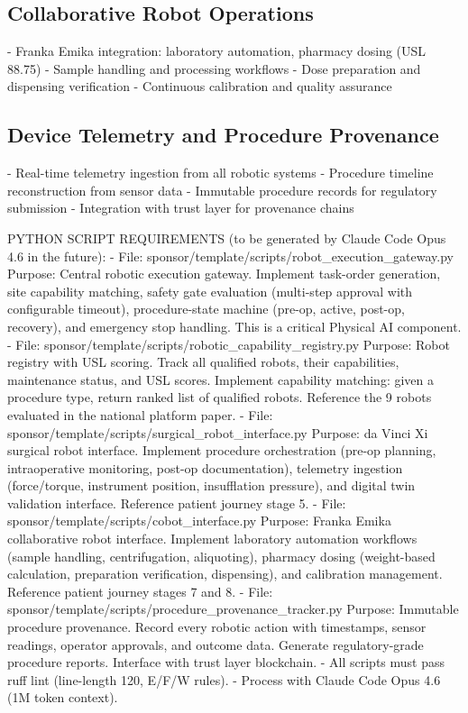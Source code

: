 \subsection{Collaborative Robot Operations}
- Franka Emika integration: laboratory automation, pharmacy dosing (USL 88.75)
- Sample handling and processing workflows
- Dose preparation and dispensing verification
- Continuous calibration and quality assurance

\subsection{Device Telemetry and Procedure Provenance}
- Real-time telemetry ingestion from all robotic systems
- Procedure timeline reconstruction from sensor data
- Immutable procedure records for regulatory submission
- Integration with trust layer for provenance chains

PYTHON SCRIPT REQUIREMENTS (to be generated by Claude Code Opus 4.6 in the future):
- File: sponsor/template/scripts/robot\_execution\_gateway.py
  Purpose: Central robotic execution gateway. Implement task-order generation,
  site capability matching, safety gate evaluation (multi-step approval
  with configurable timeout), procedure-state machine (pre-op, active, post-op,
  recovery), and emergency stop handling. This is a critical Physical AI component.
- File: sponsor/template/scripts/robotic\_capability\_registry.py
  Purpose: Robot registry with USL scoring. Track all qualified robots, their
  capabilities, maintenance status, and USL scores. Implement capability
  matching: given a procedure type, return ranked list of qualified robots.
  Reference the 9 robots evaluated in the national platform paper.
- File: sponsor/template/scripts/surgical\_robot\_interface.py
  Purpose: da Vinci Xi surgical robot interface. Implement procedure orchestration
  (pre-op planning, intraoperative monitoring, post-op documentation), telemetry
  ingestion (force/torque, instrument position, insufflation pressure), and
  digital twin validation interface. Reference patient journey stage 5.
- File: sponsor/template/scripts/cobot\_interface.py
  Purpose: Franka Emika collaborative robot interface. Implement laboratory
  automation workflows (sample handling, centrifugation, aliquoting), pharmacy
  dosing (weight-based calculation, preparation verification, dispensing),
  and calibration management. Reference patient journey stages 7 and 8.
- File: sponsor/template/scripts/procedure\_provenance\_tracker.py
  Purpose: Immutable procedure provenance. Record every robotic action with
  timestamps, sensor readings, operator approvals, and outcome data. Generate
  regulatory-grade procedure reports. Interface with trust layer blockchain.
- All scripts must pass ruff lint (line-length 120, E/F/W rules).
- Process with Claude Code Opus 4.6 (1M token context).

